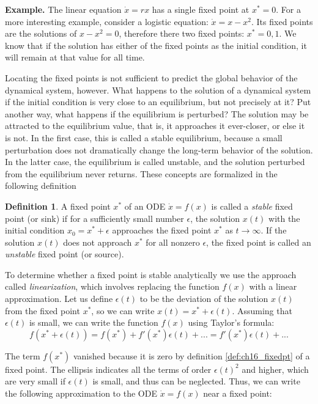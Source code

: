 \documentclass[
]{book}
\theoremstyle{definition}
\newtheorem{definition}{Definition}[chapter]
\theoremstyle{definition}
\theoremstyle{definition}
\theoremstyle{remark}
\begin{document}
\textbf{Example.} The linear equation \(\dot x = rx\) has a single fixed point at \(x^* = 0\). For a more interesting example, consider a logistic equation: \(\dot x = x - x^2\). Its fixed points are the solutions of \(x - x^2 = 0\), therefore there two fixed points: \(x^* = 0, 1\). We know that if the solution has either of the fixed points as the initial condition, it will remain at that value for all time.

Locating the fixed points is not sufficient to predict the global behavior of the dynamical system, however. What happens to the solution of a dynamical system if the initial condition is very close to an equilibrium, but not precisely at it? Put another way, what happens if the equilibrium is perturbed? The solution may be attracted to the equilibrium value, that is, it approaches it ever-closer, or else it is not. In the first case, this is called a stable equilibrium, because a small perturbation does not dramatically change the long-term behavior of the solution. In the latter case, the equilibrium is called unstable, and the solution perturbed from the equilibrium never returns. These concepts are formalized in the following definition

\begin{definition}
\protect\hypertarget{def:def-stable}{}{\label{def:def-stable} }A fixed point \(x^*\) of an ODE \(\dot x = f(x)\) is called a \emph{stable} fixed point (or sink) if for a sufficiently small number \(\epsilon\), the solution \(x(t)\) with the initial condition \(x_0 = x^* + \epsilon\) approaches the fixed point \(x^*\) as \(t \rightarrow \infty\). If the solution \(x(t)\) does not approach \(x^*\) for all nonzero \(\epsilon\), the fixed point is called an \emph{unstable} fixed point (or source).
\end{definition}

To determine whether a fixed point is stable analytically we use the approach called  \emph{linearization}, which involves replacing the function \(f(x)\) with a linear approximation. Let us define \(\epsilon(t)\) to be the deviation of the solution \(x(t)\) from the fixed point \(x^*\), so we can write \(x(t) = x^* + \epsilon(t)\). Assuming that \(\epsilon(t)\) is small, we can write the function \(f(x)\) using Taylor's formula:
\[ f(x^*+\epsilon(t))= f(x^*)+f'(x^*) \epsilon(t) + ... = f'(x^*) \epsilon(t) + ... \]

The term \(f(x^*)\) vanished because it is zero by definition \ref{def:ch16_fixedpt} of a fixed point. The ellipsis indicates all the terms of order \(\epsilon(t)^2\) and higher, which are very small if \(\epsilon(t)\) is small, and thus can be neglected. Thus, we can write the following approximation to the ODE \(\dot x = f(x)\) near a fixed point:
\end{document}
